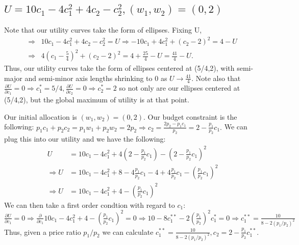 \documentclass[11pt]{article} %
\begin{document}
\subsection{$U = 10 c_1 - 4 c_{1}^2 + 4c_2 - c_{2}^2, (w_1,w_2) = (0,2)$}
%
Note that our utility curves take the form of ellipses. Fixing U,
\begin{align*}
\Rightarrow& 10 c_1 - 4 c_{1}^2 + 4c_2 - c_{2}^2 = U \Rightarrow -10 c_1 + 4 c_{1}^2 + (c_2 - 2)^2 = 4-U \\
\Rightarrow& 4\left(c_1 - \frac{5}{4}\right)^2 +  (c_2 - 2)^2 = 4 + \frac{25}{4} - U = \frac{41}{4} - U.
\end{align*}
Thus, our utility curves take the form of ellipses centered at (5/4,2), with semi-major and semi-minor axis lengths shrinking to 0 as $U \rightarrow \frac{41}{4}$. Note also that $\frac{\partial U}{\partial c_1} = 0 \Rightarrow c_1^{*} = 5/4, \frac{\partial U}{\partial c_2} = 0 \Rightarrow c_2^{*} = 2$ so not only are our ellipses centered at  (5/4,2), but the global maximum of utility is at that point.

Our initial allocation is $ (w_1,w_2) = (0,2).$ Our budget constraint is the following: $p_1 c_1 + p_2 c_2 = p_1 w_1 + p_2 w_2 = 2p_2 \Rightarrow c_2 = \frac{2p_2 - p_1 c_1}{p_2} = 2 - \frac{p_1}{p_2}c_1.$ We can plug this into our utility and we have the following:
\begin{align*}
U &= 10c_1 - 4c_1^2 + 4\left(2 -  \frac{p_1}{p_2}c_1 \right)- \left(2 -  \frac{p_1}{p_2}c_1 \right)^2 \\
\Rightarrow U &= 10c_1 - 4c_1^2 + 8 - 4\frac{p_1}{p_2}c_1 - 4 + 4\frac{p_1}{p_2}c_1 - \left( \frac{p_1}{p_2}c_1 \right)^2 \\
\Rightarrow U &= 10c_1 - 4c_1^2 + 4 - \left( \frac{p_1}{p_2}c_1 \right)^2
\end{align*}
We can then take a first order condtion with regard to $c_1$: $\frac{\partial U}{\partial c_1} = 0 \Rightarrow \frac{\partial}{\partial c_1} 10c_1 - 4c_1^2 + 4 - \left( \frac{p_1}{p_2}c_1 \right)^2 = 0 \Rightarrow 10 - 8c_1^{**} - 2 \left(\frac{p_1}{p_2}\right)^2c_1^{*} = 0 \Rightarrow c_1^{**} = \frac{10}{8 - 2(p_1/p_2)^2}$
Thus, given a price ratio $p_1/p_2$ we can calculate $c_1^{**} = \frac{10}{8 - 2(p_1/p_2)^2}, c_2 = 2 - \frac{p_1}{p_2}c_1^{**}$.
\end{document}
